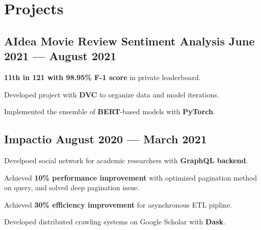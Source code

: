 \section{Projects}



\subsection*{AIdea Movie Review Sentiment Analysis \hfill June 2021 --- August 2021} 
\begin{zitemize}
    \item \textbf{11th in 121 with 98.95\% F-1 score} in private leaderboard.
    \item Developed project with \textbf{DVC} to organize data and model iterations.
    \item Implemented the ensemble of \textbf{BERT}-based models with \textbf{PyTorch}.
\end{zitemize}


\subsection*{Impactio \hfill August 2020 --- March 2021} 
    \begin{zitemize}
        \item Develpoed social network for academic researchers with \textbf{GraphQL backend}.
        \item Achieved \textbf{10\% performance improvement} with optimized pagination method on query, and solved deep pagination issue.
        \item Achieved \textbf{30\% efficiency improvement} for asynchronous ETL pipline.
        \item Developed distributed crawling systems on Google Scholar with \textbf{Dask}.
    \end{zitemize}

